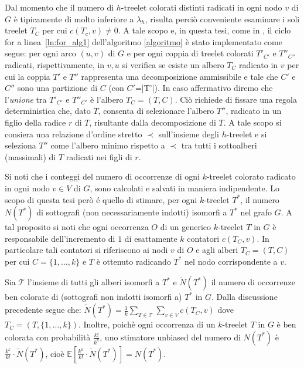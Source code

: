 Dal momento che il numero di $h$-treelet colorati distinti radicati in ogni nodo $v$ di $G$ è tipicamente di molto inferiore a $\lambda_h$, risulta perciò conveniente esaminare i soli treelet $T_C$ per cui $c(T_c, v) \neq 0$.
A tale scopo e, in questa tesi, come in \cite{bressan2019motivo}, il ciclo for a linea~\ref{ln:for_alg1} dell'algoritmo \ref{algoritmo} è stato implementato come segue:
per ogni arco $(u,v)$ di $G$ e per ogni coppia di treelet colorati $T'_{C'}$ e $T''_{C''}$ radicati, rispettivamente, in $v,u$  si verifica se esiste un albero $T_C$ radicato in $v$ per cui la coppia  $ T'$ e $ T''$ rappresenta una decomposizione ammissibile e tale che $C'$ e $C''$ sono una partizione di $C$ (con $C'$=|T'|). In caso affermativo diremo che l'\emph{unione} tra $T'_{C'}$ e $T''_{C'}$ è l'albero $T_C = (T, C)$.
Ciò richiede di fissare una regola deterministica che, dato $T$, consenta di selezionare l'albero $T''$, radicato in un figlio della radice $r$ di $T$, risultante dalla decomposizione di $T$. A tale scopo si consiera una relazione d'ordine stretto $\prec$ sull'insieme degli $h$-treelet e si seleziona $T''$ come l'albero minimo rispetto a $\prec$ tra tutti i sottoalberi (massimali) di $T$ radicati nei figli di $r$.




Si noti che i conteggi del numero di occorrenze di ogni $ k $-treelet colorato radicato in ogni nodo $ v\in V $ di $ G $, sono calcolati e salvati in maniera indipendente.
Lo scopo di questa tesi per\`o \'e quello di stimare, per ogni $k$-treelet $T^*$, il numero $N(T^*)$ di  sottografi (non necessariamente indotti) isomorfi a $T^*$ nel grafo $ G $.
A tal proposito si noti che ogni occorrenza $O$ di un generico $k$-treelet $T$ in $G$ è responsabile dell'incremento di $1$ di esattamente $k$ contatori $c(T_C, v)$. In particolare tali contatori si riferiscono ai nodi $v$ di $O$ e agli alberi $T_C = (T,C)$ per cui $C = \{1, \dots, k\} $ e $T$ è ottenuto radicando $T^*$ nel nodo corrispondente a $v$.

Sia $\mathcal{T}$ l'insieme di tutti gli alberi isomorfi a $T^*$ e $\widetilde{N}(T^*)$ il numero di occorrenze ben colorate di (sottografi non indotti isomorfi a) $T^*$ in $G$. Dalla discussione precedente segue che:
$\widetilde{N}(T^*) = \frac{1}{k}\sum_{T \in \mathcal{T}} \sum_{v \in V} c( T_C, v)$ dove $T_C = (T, \{1,\dots, k\})$. 
Inoltre, poich\`e ogni occorrenza di un $k$-treelet $T$ in $G$ è ben colorata con probabilità $\frac{k!}{k^k}$, uno stimatore unbiased del numero di $N(T^*)$ è $\frac{k^k}{k!} \cdot \widetilde{N}(T^*)$, cioè
$\mathbb{E}\left[\frac{k^k}{k!} \cdot \widetilde{N}(T^*)\right] = N(T^*)$.



